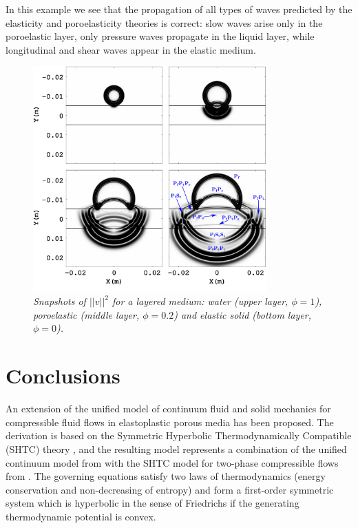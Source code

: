 \documentclass[3p,times,table]{article}
\begin{document}
In this example we see that the propagation of all types of waves 
predicted by the elasticity and poroelasticity theories is correct: slow waves arise only 
in the poroelastic layer, only pressure waves propagate in the liquid layer, while  
longitudinal and shear waves appear in the elastic medium.
\begin{figure}[!htbp]
	\begin{center}
	\includegraphics[draft=false,width=0.8\textwidth]{Figures/Layered_media_u1_u2_v4}
	\end{center}
	\caption{{\footnotesize \it  Snapshots of $ ||v||^2 $ for a layered medium: water (upper 
	layer, $ \phi=1 $), poroelastic (middle layer,  $ \phi=0.2 $) and elastic 
	solid  (bottom layer, $ \phi=0 $).}}
	\label{fig: layered_snap}
\end{figure}


\section{Conclusions}

An extension of the unified model of continuum fluid and solid mechanics 
\cite{DPRZ2016} for compressible fluid flows in elastoplastic porous media has 
been proposed.
The derivation  is based on the Symmetric Hyperbolic 
Thermodynamically Compatible (SHTC) theory \cite{SHTC-GENERIC-CMAT}, and the 
resulting model represents a combination of the unified continuum model from 
\cite{DPRZ2016} with the SHTC model for two-phase compressible flows from 
\cite{RomDrikToro2010}.
The governing equations satisfy two laws of thermodynamics (energy 
conservation and non-decreasing of  entropy) and form a first-order symmetric  
system 
which 
is hyperbolic in the sense of Friedrichs \cite{Friedrichs1958} if the 
generating thermodynamic potential is convex.
\end{document}

